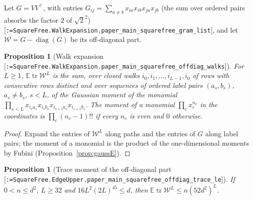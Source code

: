 \documentclass[11pt]{article}
\makeatletter
\newcommand{\formal@break}[1]{\@tfor\formal@tok:=#1\do{%
  \formal@tok
  \expandafter\ifx\formal@tok.\allowbreak\else
  \expandafter\ifx\formal@tok\_\allowbreak\fi\fi}}
\DeclareRobustCommand{\formal}[1]{\textnormal{[\texttt{\small\formal@break{#1}}]}}
\newcommand{\E}{\mathbb{E}}
\newcommand{\tr}{\operatorname{tr}}
\newcommand{\diag}{\operatorname{diag}}
\theoremstyle{plain}
\newtheorem{proposition}[theorem]{Proposition}
\theoremstyle{definition}
\makeatother
\begin{document}
Let $G = VV^{\top}$, with entries $G_{ij} = \sum_{a\ne b}x_{ia}x_{ib}x_{ja}x_{jb}$
(the sum over ordered pairs absorbs the factor $2$ of $\sqrt2^2$)
\formal{SquareFree.WalkExpansion.paper\_main\_squarefree\_gram\_list}, and
let $\mathcal{W} = G - \diag(G)$ be its off-diagonal part.

\begin{proposition}[Walk expansion \formal{SquareFree.WalkExpansion.paper\_main\_squarefree\_offdiag\_walks}]\label{prop:walks}
For $L \ge 1$, $\E\tr\mathcal{W}^L$ is the sum, over closed walks
$i_0, i_1, \dots, i_{L-1}, i_0$ of rows with consecutive rows distinct and
over sequences of ordered label pairs $(a_s, b_s)$, $a_s \ne b_s$, $s < L$,
of the Gaussian moment of the monomial
$\prod_{s<L} x_{i_sa_s}x_{i_sb_s}x_{i_{s+1}a_s}x_{i_{s+1}b_s}$. The moment of a
monomial $\prod_c x_c^{n_c}$ in the coordinates is $\prod_c (n_c - 1)!!$ if
every $n_c$ is even and $0$ otherwise.
\end{proposition}

\begin{proof}
Expand the entries of $\mathcal{W}^L$ along paths and the entries of $G$
along label pairs; the moment of a monomial is the product of the
one-dimensional moments by Fubini (Proposition~\ref{prop:gaussE}).
\end{proof}

\begin{proposition}[Trace moment of the off-diagonal part \formal{SquareFree.EdgeUpper.paper\_main\_squarefree\_offdiag\_trace\_le}]\label{prop:tracemoment}
If $0 < n \le d^2$, $L \ge 32$ and $16L^2(2L)^{45} \le d$, then
$\E\tr\mathcal{W}^L \le n(52d^2)^L$.
\end{proposition}
\end{document}
